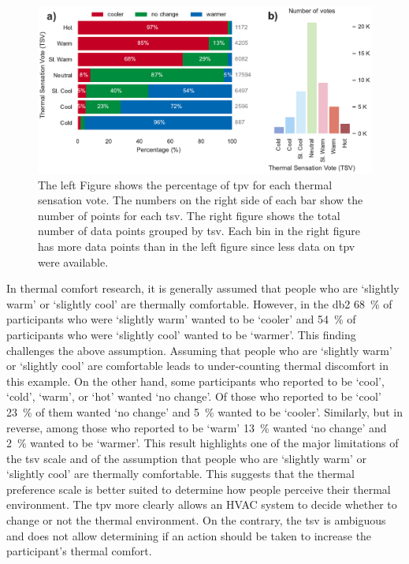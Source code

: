 \begin{figure}[htb!]
    \centering
    \includegraphics[width=\textwidth]{figures/bar_plot_tp_by_ts}
    \caption{The left Figure shows the percentage of \ac{tpv} for each thermal sensation vote.
    The numbers on the right side of each bar show the number of points for each \ac{tsv}.
    The right figure shows the total number of data points grouped by \ac{tsv}.
    Each bin in the right figure has more data points than in the left figure since less data on \ac{tpv} were available.}
    \label{fig:bar_plot_tp_by_ts}
\end{figure}

In thermal comfort research, it is generally assumed that people who are `slightly warm' or `slightly cool' are thermally comfortable.
However, in the \ac{db2} \qty{68}{\percent} of participants who were `slightly warm' wanted to be `cooler' and \qty{54}{\percent} of participants who were `slightly cool' wanted to be `warmer'.
This finding challenges the above assumption.
Assuming that people who are `slightly warm' or `slightly cool' are comfortable leads to under-counting thermal discomfort in this example.
On the other hand, some participants who reported to be `cool', `cold', `warm', or `hot' wanted `no change'.
Of those who reported to be `cool' \qty{23}{\percent} of them wanted `no change' and \qty{5}{\percent} wanted to be `cooler'.
Similarly, but in reverse, among those who reported to be `warm' \qty{13}{\percent} wanted `no change' and \qty{2}{\percent} wanted to be `warmer'.
This result highlights one of the major limitations of the \ac{tsv} scale and of the assumption that people who are `slightly warm' or `slightly cool' are thermally comfortable.
This suggests that the thermal preference scale is better suited to determine how people perceive their thermal environment.
The \ac{tpv} more clearly allows an HVAC system to decide whether to change or not the thermal environment. 
On the contrary, the \ac{tsv} is ambiguous and does not allow determining if an action should be taken to increase the participant's thermal comfort.

